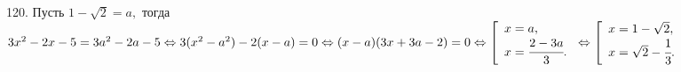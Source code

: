 120. Пусть $1-\sqrt{2}=a,$ тогда $3x^2-2x-5=3a^2-2a-5\Leftrightarrow 3(x^2-a^2)-2(x-a)=0\Leftrightarrow (x-a)(3x+3a-2)=0\Leftrightarrow
\left[\begin{array}{l}x=a,\\x=\cfrac{2-3a}{3}.\end{array}\right.\Leftrightarrow
\left[\begin{array}{l}x=1-\sqrt{2},\\x=\sqrt{2}-\cfrac{1}{3}.\end{array}\right.$\\
